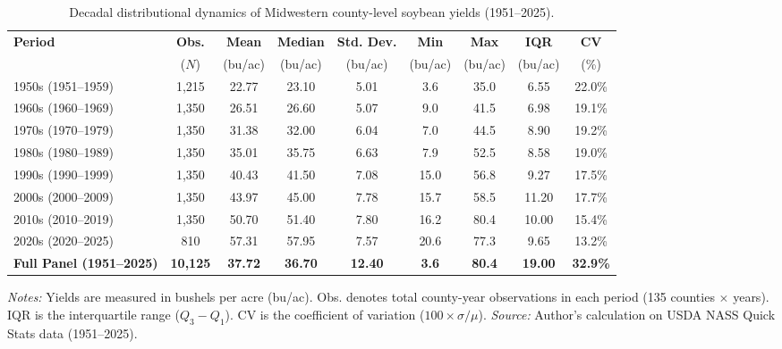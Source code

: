 \begin{table}[htbp]
\centering
\footnotesize
\setlength{\tabcolsep}{3.5pt}
\caption{Decadal distributional dynamics of Midwestern county-level soybean yields (1951--2025).}
\label{tab:decadal_yields}
\begin{tabular*}{\textwidth}{@{\extracolsep{\fill}}l c c c c c c c c}
\toprule
\textbf{Period} & \textbf{Obs.} & \textbf{Mean} & \textbf{Median} & \textbf{Std. Dev.} & \textbf{Min} & \textbf{Max} & \textbf{IQR} & \textbf{CV} \\
 & ($N$) & (bu/ac) & (bu/ac) & (bu/ac) & (bu/ac) & (bu/ac) & (bu/ac) & (\%) \\
\midrule
1950s (1951--1959) & 1,215 & 22.77 & 23.10 & 5.01 & 3.6 & 35.0 & 6.55 & 22.0\% \\
1960s (1960--1969) & 1,350 & 26.51 & 26.60 & 5.07 & 9.0 & 41.5 & 6.98 & 19.1\% \\
1970s (1970--1979) & 1,350 & 31.38 & 32.00 & 6.04 & 7.0 & 44.5 & 8.90 & 19.2\% \\
1980s (1980--1989) & 1,350 & 35.01 & 35.75 & 6.63 & 7.9 & 52.5 & 8.58 & 19.0\% \\
1990s (1990--1999) & 1,350 & 40.43 & 41.50 & 7.08 & 15.0 & 56.8 & 9.27 & 17.5\% \\
2000s (2000--2009) & 1,350 & 43.97 & 45.00 & 7.78 & 15.7 & 58.5 & 11.20 & 17.7\% \\
2010s (2010--2019) & 1,350 & 50.70 & 51.40 & 7.80 & 16.2 & 80.4 & 10.00 & 15.4\% \\
2020s (2020--2025) & 810 & 57.31 & 57.95 & 7.57 & 20.6 & 77.3 & 9.65 & 13.2\% \\
\midrule
\textbf{Full Panel (1951--2025)} & \textbf{10,125} & \textbf{37.72} & \textbf{36.70} & \textbf{12.40} & \textbf{3.6} & \textbf{80.4} & \textbf{19.00} & \textbf{32.9\%} \\
\bottomrule
\end{tabular*}
\vspace{1ex}
\raggedright
\footnotesize{\textit{Notes:} Yields are measured in bushels per acre (bu/ac). Obs. denotes total county-year observations in each period (135 counties $\times$ years). IQR is the interquartile range ($Q_3 - Q_1$). CV is the coefficient of variation ($100 \times \sigma / \mu$). \textit{Source:} Author's calculation on USDA NASS Quick Stats data (1951--2025).}
\end{table}
